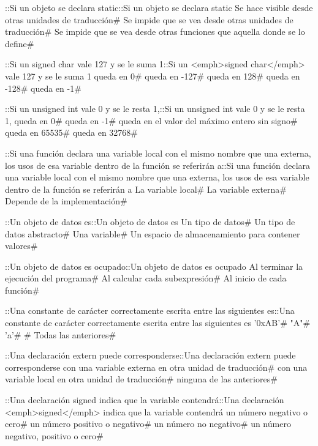 {{{{{{{{{{{{{{\question ::Si un objeto se declara static::Si un objeto se declara static
\choice Se hace visible desde otras unidades de traducción# 
\correctchoice Se impide que se vea desde otras unidades de traducción# 
\choice Se impide que se vea desde otras funciones que aquella donde se lo define# 

\question ::Si un signed char vale 127 y se le suma 1\:::Si un <emph>signed char</emph> vale 127 y se le suma 1\:
\choice queda en 0# 
\choice queda en -127# 
\choice queda en 128# 
\correctchoice queda en -128# 
\choice queda en -1# 

\question ::Si un unsigned int vale 0 y se le resta 1,::Si un unsigned int vale 0 y se le resta 1,
\choice queda en 0# 
\choice queda en -1# 
\correctchoice queda en el valor del máximo entero sin signo# 
\choice queda en 65535# 
\choice queda en 32768# 

\question ::Si una función declara una variable local con el mismo nombre que una externa, los usos de esa variable dentro de la función se referirán a::Si una función declara una variable local con el mismo nombre que una externa, los usos de esa variable dentro de la función se referirán a
\correctchoice La variable local# 
\choice La variable externa# 
\choice Depende de la implementación# 

\question ::Un objeto de datos es::Un objeto de datos es
\choice Un tipo de datos# 
\choice Un tipo de datos abstracto# 
\choice Una variable# 
\correctchoice Un espacio de almacenamiento para contener valores# 

\question ::Un objeto de datos es ocupado::Un objeto de datos es ocupado
\choice Al terminar la ejecución del programa# 
\correctchoice Al calcular cada subexpresión# 
\choice Al inicio de cada función# 

\question ::Una constante de carácter correctamente escrita entre las siguientes es\:::Una constante de carácter correctamente escrita entre las siguientes es\:
\choice '0xAB'# 
\choice "A"# 
\correctchoice 'a'# 
# 
\choice Todas las anteriores# 

\question ::Una declaración extern puede corresponderse::Una declaración extern puede corresponderse
\correctchoice con una variable externa en otra unidad de traducción# 
\choice con una variable local en otra unidad de traducción# 
\choice ninguna de las anteriores# 

\question ::Una declaración signed indica que la variable contendrá::Una declaración <emph>signed</emph> indica que la variable contendrá
\choice un número negativo o cero# 
\choice un número positivo o negativo# 
\choice un número no negativo# 
\correctchoice un número negativo, positivo o cero# 

}}}}}}}}}}}}}}
